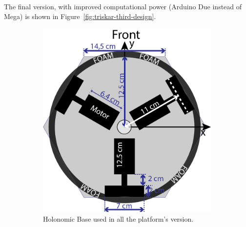 The final version, with improved computational power (Arduino Due instead of Mega) is shown in Figure~\ref{fig:triskar-third-design}.
\begin{figure}[h]
	\centering
	\begin{subfigure}[c]{0.3\textwidth}
	\centering
	\includegraphics[width=\textwidth]{./Images/TriskarThird.png}
	\caption{Holonomic Base used in all the platform's version.}
	\label{fig:holonomic-platform}
	\end{subfigure}
	\begin{subfigure}[c]{0.3\textwidth}
	\centering

\end{subfigure}
\end{figure}
